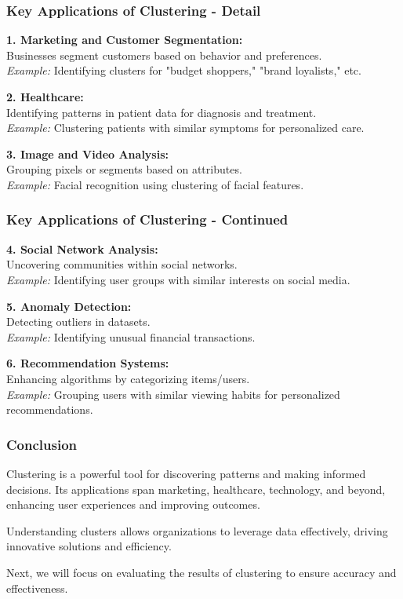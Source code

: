 \documentclass[aspectratio=169]{beamer}
\begin{document}
\begin{frame}[fragile]
  \frametitle{Key Applications of Clustering - Detail}
  
  \textbf{1. Marketing and Customer Segmentation:} \\
  Businesses segment customers based on behavior and preferences. \\ 
  \textit{Example:} Identifying clusters for "budget shoppers," "brand loyalists," etc.

  \textbf{2. Healthcare:} \\
  Identifying patterns in patient data for diagnosis and treatment. \\ 
  \textit{Example:} Clustering patients with similar symptoms for personalized care.

  \textbf{3. Image and Video Analysis:} \\
  Grouping pixels or segments based on attributes. \\ 
  \textit{Example:} Facial recognition using clustering of facial features.
\end{frame}

\begin{frame}[fragile]
  \frametitle{Key Applications of Clustering - Continued}
  
  \textbf{4. Social Network Analysis:} \\
  Uncovering communities within social networks. \\ 
  \textit{Example:} Identifying user groups with similar interests on social media.

  \textbf{5. Anomaly Detection:} \\
  Detecting outliers in datasets. \\ 
  \textit{Example:} Identifying unusual financial transactions.

  \textbf{6. Recommendation Systems:} \\
  Enhancing algorithms by categorizing items/users. \\ 
  \textit{Example:} Grouping users with similar viewing habits for personalized recommendations.
\end{frame}

\begin{frame}[fragile]
  \frametitle{Conclusion}
  
  Clustering is a powerful tool for discovering patterns and making informed decisions. Its applications span marketing, healthcare, technology, and beyond, enhancing user experiences and improving outcomes.

  Understanding clusters allows organizations to leverage data effectively, driving innovative solutions and efficiency.

  Next, we will focus on evaluating the results of clustering to ensure accuracy and effectiveness.
\end{frame}
\end{document}
